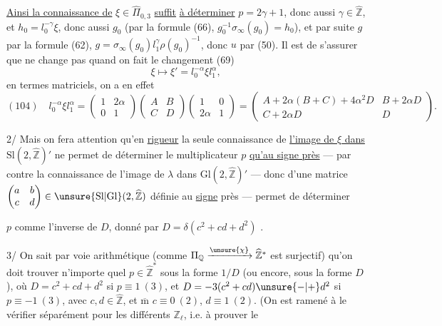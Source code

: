 \uline{Ainsi la connaissance de} $\xi\in\widehat{\Pi}_{0,3}$ \uline{suffit} \uline{à déterminer}  $p=2\gamma+1$, donc aussi $\gamma\in\widehat{\mathbb Z}$, et $h_0=l_0^{-\gamma}\xi$, donc aussi $g_0$ (par la formule (66), $g_0^{-1}\sigma_\infty(g_0)=h_0$), et par suite $g$ par la formule (62), $g=\sigma_\infty(g_0)l_1^\gamma\rho(g_0)^{-1}$, donc $u$ par (50). Il est  de s'assurer que   ne change pas quand on fait le changement (69)
\[
\xi\longmapsto\xi'=l_0^{-\alpha}\xi l_1^\alpha,
\]
en termes matriciels, on a en effet
\[
(104)\quad l_0^{-\alpha}\xi l_1^\alpha=
\begin{pmatrix}1&2\alpha\\0&1\end{pmatrix}
\begin{pmatrix}A&B\\C&D\end{pmatrix}
\begin{pmatrix}1&0\\2\alpha&1\end{pmatrix}
=\begin{pmatrix}A+2\alpha(B+C)+4\alpha^2D&B+2\alpha D\\C+2\alpha D&D\end{pmatrix}.
\]

2/ Mais on fera attention qu'en  \uline{rigueur} la seule connaissance de \uline{l'image de $\xi$ dans} $\mathrm{Sl}(2,\widehat{\mathbb Z})'$ ne permet de déterminer le multiplicateur $p$ \uline{qu'au signe près} --- par contre la connaissance de l'image de $\lambda$ dans $\mathrm{Gl}(2,\widehat{\mathbb Z})'$ --- donc d'une matrice $\begin{pmatrix}a&b\\c&d\end{pmatrix}\in\unsure{\mathrm{Sl}|\mathrm{Gl}}(2,\widehat{\mathbb Z})$ définie au \uline{signe} près --- permet de déterminer


$p$ comme l'inverse de $D$, donné  par $D=\delta(c^2+cd+d^2)$ . 

3/ On sait par voie arithmétique (comme $\Pi_{\mathbb Q}\xrightarrow{\unsure{\chi}}\widehat{\mathbb Z}^{*}$ est surjectif) qu'on doit trouver n'importe quel $p\in\widehat{\mathbb Z}^{*}$ sous la forme $1/D$ (ou encore, sous la forme $D$), où $D=c^2+cd+d^2$ si $p\equiv1\ (3)$, et $D=-3(c^2+cd)\unsure{-|+}d^2$ si $p\equiv-1\ (3)$, avec $c,d\in\widehat{\mathbb Z}$, et $\overline{\mathrm m}$ $c\equiv0\ (2)$, $d\equiv1\ (2)$.  (On est ramené à le vérifier séparément pour les différents $\mathbb Z_\ell$, i.e. à prouver le

